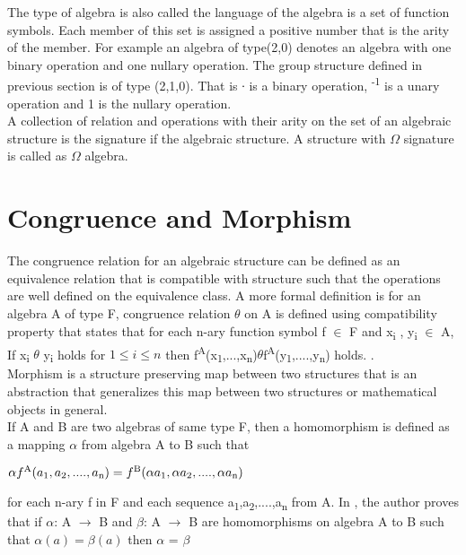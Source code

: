 The type of algebra is also called the language of the algebra is a set of function symbols. Each member of this set is assigned a positive number that is the arity of the member. For example an algebra of type(2,0) denotes an algebra with one binary operation and one nullary operation. The group structure defined in previous section is of type (2,1,0). That is ∙ is a binary operation, \textsuperscript{-1} is a unary operation and 1 is the nullary operation. \\

A collection of relation and operations with their arity on the set of an algebraic structure is the signature if the algebraic structure. A structure with \(\Omega\) signature is called as \(\Omega\) algebra.

\section{Congruence and Morphism}
The congruence relation for an algebraic structure can be defined as an equivalence relation that is compatible with structure such that the operations are well defined on the equivalence class. A more formal definition is for an algebra A of type F, congruence relation \(\theta\) on A is defined using compatibility property that states that for each n-ary function symbol f \(\in\) F and x\textsubscript{i} , y\textsubscript{i} \(\in\) A, If x\textsubscript{i} \(\theta\) y\textsubscript{i}  holds for \(1\leq i \leq n\) then f\textsuperscript{A}(x\textsubscript{1},...,x\textsubscript{n})\(\theta\)f\textsuperscript{A}(y\textsubscript{1},....,y\textsubscript{n}) holds. \cite{sankappanavar1981course}.\\

Morphism is a structure preserving map between two structures that is an abstraction that generalizes this map between two structures or mathematical objects in general. \\
If A and B are two algebras of same type F, then a homomorphism is defined as a mapping \(\alpha\) from algebra A to B such that
\begin{center}
\(\alpha f\textsuperscript{A}(a\textsubscript{1},a\textsubscript{2},....,a\textsubscript{n}) = f\textsuperscript{B}(\alpha a\textsubscript{1},\alpha a\textsubscript{2},....,\alpha a\textsubscript{n})\)\\
\end{center}
for each n-ary f in F and each sequence a\textsubscript{1},a\textsubscript{2},....,a\textsubscript{n} from A. In \cite{sankappanavar1981course}, the author proves that if \(\alpha\): A \(\rightarrow\) B and \(\beta\): A \(\rightarrow\) B are homomorphisms on algebra A to B such that \(\alpha (a) = \beta (a) \) then \(\alpha\) = \(\beta\)
\\


